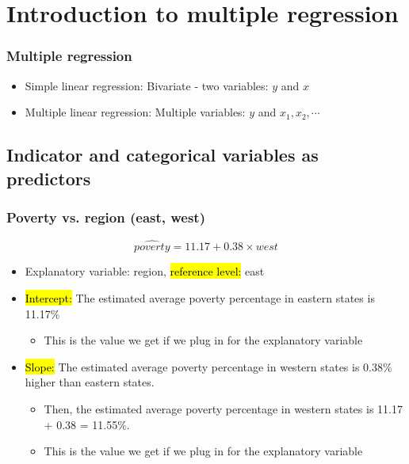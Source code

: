 
\section{Introduction to multiple regression}


\begin{frame}
\frametitle{Multiple regression}

\begin{itemize}

\item Simple linear regression: Bivariate - two variables: $y$ and $x$

\item Multiple linear regression: Multiple variables: $y$ and $x_1, x_2, \cdots$

\end{itemize}

\end{frame}


\subsection{Indicator and categorical variables as predictors}


\begin{frame}
\frametitle{Poverty vs. region (east, west)}


\[ \widehat{poverty} = 11.17 + 0.38 \times west \]

\begin{itemize}

\item Explanatory variable: region, \hl{reference level:} east

\item \hl{Intercept:} The estimated average poverty percentage in eastern states is 11.17\%
\pause
\begin{itemize}
\item This is the value we get if we plug in  for the explanatory variable
\end{itemize}

\pause

\item \hl{Slope:} The estimated average poverty percentage in western states is 0.38\% higher than eastern states.
\pause
\begin{itemize}
\item Then, the estimated average poverty percentage in western states is 11.17 + 0.38 =  11.55\%.
\pause
\item This is the value we get if we plug in  for the explanatory variable
\end{itemize}

\end{itemize}

\end{frame}

